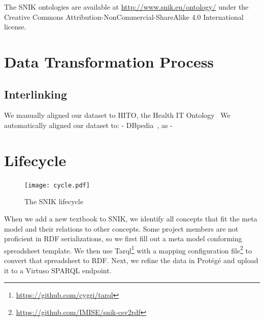 \documentclass[sw]{iosart2x}
\renewcommand{\citep}{\cite}%
\begin{document}
The SNIK ontologies are available at \url{http://www.snik.eu/ontology/} under the Creative Commons Attribution-NonCommercial-ShareAlike 4.0 International license.

\section{Data Transformation Process}
\subsection{Interlinking}
We manually aligned our dataset to HITO, the Health IT Ontology~\citep{hito}
We automatically aligned our dataset to:
- DBpedia~\citep{dbpedia}, as  
- 
\section{Lifecycle}\label{sec:application}

\begin{figure}[ht]
\caption{The SNIK lifecycle}
\label{fig:lifecycle}
\texttt{[image: cycle.pdf]}
\end{figure}

When we add a new textbook to SNIK, we identify all concepts that fit the meta model and their relations to other concepts.
Some project members are not proficient in RDF serializations, so we first fill out a meta model conforming spreadsheet template.
We then use Tarql\footnote{\url{https://github.com/cygri/tarql}} with a mapping configuration file\footnote{\url{https://github.com/IMISE/snik-csv2rdf}} to convert that spreadsheet to RDF.
Next, we refine the data in Protégé and upload it to a Virtuso SPARQL endpoint.
\end{document}
